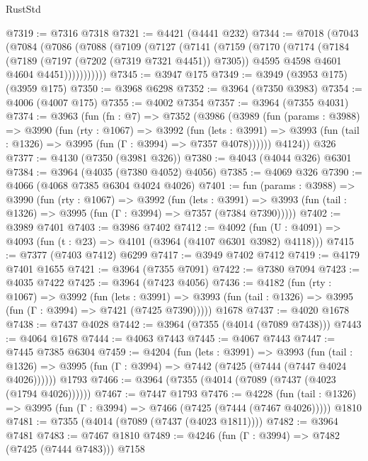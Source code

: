 \begin{lexlean}{RustStd}
\begin{coremodule}
@7319 := @7316 @7318
@7321 := @4421 (@4441 @232)
@7344 := @7018
    (@7043
      (@7084
        (@7086
          (@7088
            (@7109
              (@7127
                (@7141
                  (@7159
                    (@7170
                      (@7174
                        (@7184
                          (@7189 (@7197 (@7202 (@7319 @7321 @4451)) @7305))
                          @4595
                          @4598
                          @4601
                          @4604
                          @4451)))))))))))
@7345 := @3947 @175
@7349 := @3949 (@3953 @175) (@3959 @175)
@7350 := @3968 @6298
@7352 := @3964 (@7350 @3983)
@7354 := @4006 (@4007 @175)
@7355 := @4002 @7354
@7357 := @3964 (@7355 @4031)
@7374 := @3963
    (fun (fn : @7) =>
    @7352
      (@3986
        (@3989
          (fun (params : @3988) =>
          @3990
            (fun (rty : @1067) =>
            @3992
              (fun (lets : @3991) =>
              @3993 (fun (tail : @1326) => @3995 (fun (Γ : @3994) => @7357 @4078))))))
        @4124))
    @326
@7377 := @4130 (@7350 (@3981 @326))
@7380 := @4043 (@4044 @326) @6301
@7384 := @3964 (@4035 (@7380 @4052) @4056)
@7385 := @4069 @326
@7390 := @4066 (@4068 @7385 @6304 @4024 @4026)
@7401 := fun (params : @3988) =>
  @3990
    (fun (rty : @1067) =>
    @3992
      (fun (lets : @3991) =>
      @3993 (fun (tail : @1326) => @3995 (fun (Γ : @3994) => @7357 (@7384 @7390)))))
@7402 := @3989 @7401
@7403 := @3986 @7402
@7412 := @4092 (fun (U : @4091) => @4093 (fun (t : @23) => @4101 (@3964 (@4107 @6301 @3982) @4118)))
@7415 := @7377 (@7403 @7412) @6299
@7417 := @3949 @7402 @7412
@7419 := @4179 @7401 @1655
@7421 := @3964 (@7355 @7091)
@7422 := @7380 @7094
@7423 := @4035 @7422
@7425 := @3964 (@7423 @4056)
@7436 := @4182
    (fun (rty : @1067) =>
    @3992
      (fun (lets : @3991) =>
      @3993 (fun (tail : @1326) => @3995 (fun (Γ : @3994) => @7421 (@7425 @7390)))))
    @1678
@7437 := @4020 @1678
@7438 := @7437 @4028
@7442 := @3964 (@7355 (@4014 (@7089 @7438)))
@7443 := @4064 @1678
@7444 := @4063 @7443
@7445 := @4067 @7443
@7447 := @7445 @7385 @6304
@7459 := @4204
    (fun (lets : @3991) =>
    @3993
      (fun (tail : @1326) => @3995 (fun (Γ : @3994) => @7442 (@7425 (@7444 (@7447 @4024 @4026))))))
    @1793
@7466 := @3964 (@7355 (@4014 (@7089 (@7437 (@4023 (@1794 @4026))))))
@7467 := @7447 @1793
@7476 := @4228
    (fun (tail : @1326) => @3995 (fun (Γ : @3994) => @7466 (@7425 (@7444 (@7467 @4026)))))
    @1810
@7481 := @7355 (@4014 (@7089 (@7437 (@4023 @1811))))
@7482 := @3964 @7481
@7483 := @7467 @1810
@7489 := @4246 (fun (Γ : @3994) => @7482 (@7425 (@7444 @7483))) @7158

\end{coremodule}
\end{lexlean}
